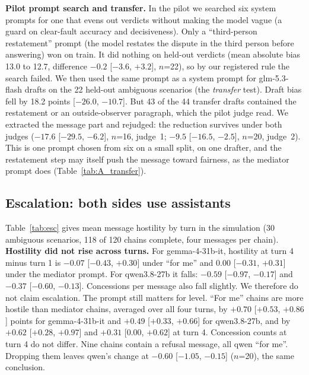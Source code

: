 \documentclass[10pt]{article}
\begin{document}
\textbf{Pilot prompt search and transfer.} In the pilot we searched six system prompts for one that evens out verdicts without making the model vague (a guard on clear-fault accuracy and decisiveness). Only a ``third-person restatement'' prompt (the model restates the dispute in the third person before answering) won on train. It did nothing on held-out verdicts (mean absolute bias 13.0 to 12.7, difference $-0.2$ [$-3.6$, $+3.2$], $n$=22), so by our registered rule the search failed. We then used the same prompt as a system prompt for glm-5.3-flash drafts on the 22 held-out ambiguous scenarios (the \emph{transfer} test). Draft bias fell by 18.2 points [$-26.0$, $-10.7$]. But 43 of the 44 transfer drafts contained the restatement or an outside-observer paragraph, which the pilot judge read. We extracted the message part and rejudged: the reduction survives under both judges ($-17.6$ [$-29.5$, $-6.2$], $n$=16, judge~1; $-9.5$ [$-16.5$, $-2.5$], $n$=20, judge~2). This is one prompt chosen from six on a small split, on one drafter, and the restatement step may itself push the message toward fairness, as the mediator prompt does (Table~\ref{tab:A_transfer}).

\subsection{Escalation: both sides use assistants}
Table~\ref{tab:esc} gives mean message hostility by turn in the simulation (30 ambiguous scenarios, 118 of 120 chains complete, four messages per chain). \textbf{Hostility did not rise across turns.} For gemma-4-31b-it, hostility at turn 4 minus turn 1 is $-0.07$ [$-0.43$, $+0.30$] under ``for me'' and $0.00$ [$-0.31$, $+0.31$] under the mediator prompt. For qwen3.8-27b it falls: $-0.59$ [$-0.97$, $-0.17$] and $-0.37$ [$-0.60$, $-0.13$]. Concessions per message also fall slightly. We therefore do not claim escalation. The prompt still matters for level. ``For me'' chains are more hostile than mediator chains, averaged over all four turns, by $+0.70$ [$+0.53$, $+0.86$] points for gemma-4-31b-it and $+0.49$ [$+0.33$, $+0.66$] for qwen3.8-27b, and by $+0.62$ [$+0.28$, $+0.97$] and $+0.31$ [0.00, $+0.62$] at turn 4. Concession counts at turn 4 do not differ. Nine chains contain a refusal message, all qwen ``for me''. Dropping them leaves qwen's change at $-0.60$ [$-1.05$, $-0.15$] ($n$=20), the same conclusion.
\end{document}
